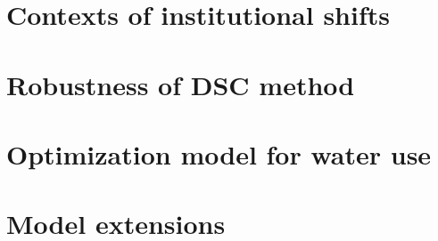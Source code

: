 \documentclass[preprint, 12pt]{elsarticle}
\begin{document}

\label{bib}

\newpage
\appendix\label{appendix}

\section{Contexts of institutional shifts}\label{secS1}
\renewcommand{\thefigure}{A\arabic{figure}}
\renewcommand{\thetable}{A\arabic{table}}
\setcounter{figure}{0}
\setcounter{table}{0}


\section{Robustness of DSC method}\label{secS2}
\renewcommand{\thefigure}{B\arabic{figure}}
\renewcommand{\thetable}{B\arabic{table}}
\setcounter{figure}{0}
\setcounter{table}{0}


% 

\section{Optimization model for water use}\label{secS4}
\renewcommand{\thefigure}{C\arabic{figure}}
\renewcommand{\thetable}{C\arabic{table}}
\setcounter{figure}{0}
\setcounter{table}{0}


\section{Model extensions}\label{secS5}
\renewcommand{\thefigure}{D\arabic{figure}}
\renewcommand{\thetable}{D\arabic{table}}
\setcounter{figure}{0}
\setcounter{table}{0}

\end{document}
